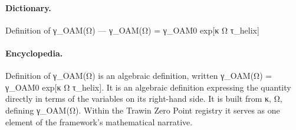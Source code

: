 \paragraph{Dictionary.}
Definition of γ\_OAM(Ω) — γ\_OAM(Ω) = γ\_OAM0 exp[κ Ω τ\_helix]

\paragraph{Encyclopedia.}
Definition of γ\_OAM(Ω) is an algebraic definition, written γ\_OAM(Ω) = γ\_OAM0 exp[κ Ω τ\_helix]. It is an algebraic definition expressing the quantity directly in terms of the variables on its right-hand side. It is built from κ, Ω, defining γ\_OAM(Ω). Within the Trawin Zero Point registry it serves as one element of the framework's mathematical narrative.
